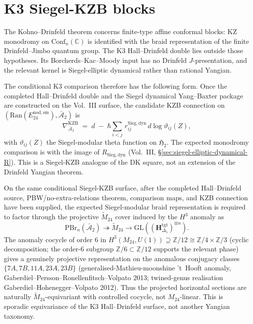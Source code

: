 \section{K3 Siegel-KZB blocks}
\label{sec:ydk-deep}

\begin{remark}
\label{rem:ydk-deep-1}
The Kohno--Drinfeld theorem concerns finite-type affine conformal
blocks: KZ monodromy on $\mathrm{Conf}_n(\mathbb C)$ is identified
with the braid representation of the finite Drinfeld--Jimbo quantum
group. The K3 Hall--Drinfeld double lies outside those hypotheses.
Its Borcherds--Kac--Moody input has no Drinfeld $J$-presentation, and
the relevant kernel is Siegel-elliptic dynamical rather than rational
Yangian.

The conditional K3 comparison therefore has the following form. Once
the completed Hall--Drinfeld double and the Siegel dynamical
Yang--Baxter package are constructed on the Vol.~III surface, the
candidate KZB connection on
$(\mathrm{Ran}(E^{\mathrm{nod,sm}}_{24}),\bar{\mathcal A}_2)$ is
\[
\nabla^{\mathrm{KZB}}_{\bar{\mathcal A}_2} \;=\; d \;-\; \hbar\sum_{i<j}\, r_{ij}^{\mathrm{Sieg,dyn}}\,d\log\vartheta_{ij}(Z),
\]
with $\vartheta_{ij}(Z)$ the Siegel-modular theta function on
$\mathfrak H_2$. The expected monodromy comparison is with the
image of $R_{\mathrm{Sieg,dyn}}$
\textup{(}Vol.~III, \S\ref{sec:siegel-elliptic-dynamical-R}\textup{)}.
This is a Siegel-KZB analogue of the DK square, not an extension of
the Drinfeld Yangian theorem.
\end{remark}

\begin{remark}
\label{rem:ydk-deep-2}
On the same conditional Siegel-KZB surface, after the completed
Hall--Drinfeld source, PBW/no-extra-relations theorem, comparison
maps, and KZB connection have been supplied, the expected
Siegel-modular braid representation is required to factor through the
projective $\widetilde{M}_{24}$ cover induced by the $H^3$ anomaly as
\[
\mathrm{PBr}_n(\bar{\mathcal A}_2)\twoheadrightarrow\widetilde{M}_{24}\to\mathrm{GL}((\mathbf H_{\Delta_5}^{\mathrm{tgt}})^{\otimes n}).
\]
The anomaly cocycle of order $6$ in $H^3(M_{24},U(1)) \supseteq \mathbb Z/12 \cong \mathbb Z/4 \times \mathbb Z/3$
(cyclic decomposition; the order-$6$ subgroup $\mathbb Z/6 \subset \mathbb Z/12$ supports the relevant phase)
gives a genuinely projective representation on the anomalous conjugacy classes $\{7A,7B,11A,23A,23B\}$
(generalised-Mathieu-moonshine 't~Hooft anomaly, Gaberdiel--Persson--Ronellenfitsch--Volpato 2013;
twined-genus realisation Gaberdiel--Hohenegger--Volpato 2012). Thus the projected horizontal
sections are naturally $\widetilde M_{24}$-equivariant with controlled
cocycle, not $M_{24}$-linear. This is sporadic equivariance of the
K3 Hall--Drinfeld surface, not another Yangian taxonomy.
\end{remark}

